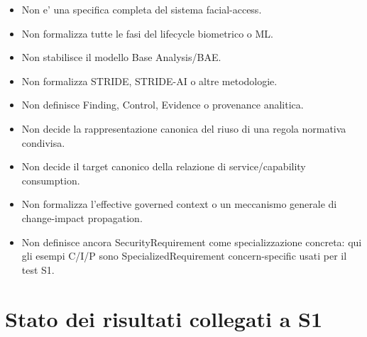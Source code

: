 \documentclass[11pt,a4paper]{article}
\begin{document}
\begin{itemize}
  \item Non e' una specifica completa del sistema facial-access.
  \item Non formalizza tutte le fasi del lifecycle biometrico o ML.
  \item Non stabilisce il modello Base Analysis/BAE.
  \item Non formalizza STRIDE, STRIDE-AI o altre metodologie.
  \item Non definisce Finding, Control, Evidence o provenance analitica.
  \item Non decide la rappresentazione canonica del riuso di una regola normativa condivisa.
  \item Non decide il target canonico della relazione di service/capability consumption.
  \item Non formalizza l'effective governed context o un meccanismo generale di change-impact propagation.
  \item Non definisce ancora SecurityRequirement come specializzazione concreta: qui gli esempi C/I/P sono SpecializedRequirement concern-specific usati per il test S1.
\end{itemize}

\section{Stato dei risultati collegati a S1}
\end{document}
